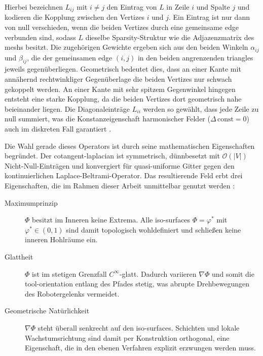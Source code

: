                 Hierbei bezeichnen $L_{ij}$ mit $i \neq j$ den Eintrag von $L$ in Zeile $i$ und Spalte $j$ und kodieren die Kopplung zwischen den Vertizes $i$ und $j$.
                Ein Eintrag ist nur dann von null verschieden, wenn die beiden Vertizes durch eine gemeinsame \gls{edge} verbunden sind, sodass $L$ dieselbe Sparsity-Struktur wie die Adjazenzmatrix des \glspl{mesh} besitzt.
                Die zugehörigen Gewichte ergeben sich aus den beiden Winkeln $\alpha_{ij}$ und $\beta_{ij}$, die der gemeinsamen \gls{edge} $(i, j)$ in den beiden angrenzenden \glspl{triangle} jeweils gegenüberliegen.
                Geometrisch bedeutet dies, dass an einer Kante mit annähernd rechtwinkliger Gegenüberlage die beiden Vertizes nur schwach gekoppelt werden.
                An einer Kante mit sehr spitzem Gegenwinkel hingegen entsteht eine starke Kopplung, da die beiden Vertizes dort geometrisch nahe beieinander liegen.
                Die Diagonaleinträge $L_{ii}$ werden so gewählt, dass jede Zeile zu null summiert, was die Konstanzeigenschaft harmonischer Felder ($\Delta\,\text{const} = 0$) auch im diskreten Fall garantiert \autocite[vgl.]{wardetzkyDiscreteLaplaceOperators2007}. 

                Die Wahl gerade dieses Operators ist durch seine mathematischen Eigenschaften begründet.
                Der \gls{cotangent-laplacian} ist symmetrisch, dünnbesetzt mit $\mathcal{O}(\lvert V\rvert)$ Nicht-Null-Einträgen und konvergiert für quasi-uniforme Gitter gegen den kontinuierlichen Laplace-Beltrami-Operator.
                Das resultierende Feld erbt drei Eigenschaften, die im Rahmen dieser Arbeit unmittelbar genutzt werden :
                \begin{description}
                    \item[Maximumprinzip] $\Phi$ besitzt im Inneren keine Extrema. Alle \glspl{iso-surface} $\Phi = \varphi^*$ mit $\varphi^* \in (0, 1)$ sind damit topologisch wohldefiniert und schließen keine inneren Hohlräume ein.
                    \item[Glattheit] $\Phi$ ist im stetigen Grenzfall $C^\infty$-glatt. Dadurch variieren $\nabla\Phi$ und somit die \gls{tool-orientation} entlang des Pfades stetig, was abrupte Drehbewegungen des Robotergelenks vermeidet.
                    \item[Geometrische Natürlichkeit] $\nabla\Phi$ steht überall senkrecht auf den \glspl{iso-surface}. Schichten und lokale Wachstumsrichtung sind damit per Konstruktion orthogonal, eine Eigenschaft, die in den ebenen Verfahren explizit erzwungen werden muss.
                \end{description}

